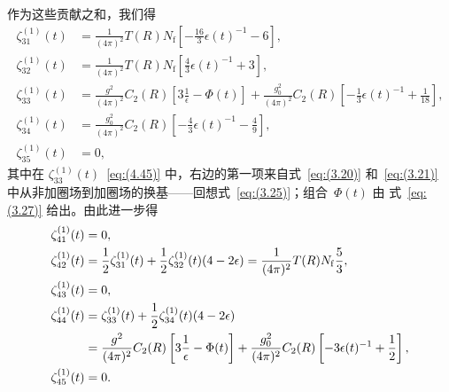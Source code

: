 %
作为这些贡献之和，我们得
\begin{align}
   \zeta_{31}^{(1)}(t)
   &=\frac{1}{(4\pi)^2}T(R)N_{\mathrm{f}}
   \left[-\frac{16}{3}\epsilon(t)^{-1}-6\right],
\label{eq:(4.43)}\\
   \zeta_{32}^{(1)}(t)
   &=\frac{1}{(4\pi)^2}T(R)N_{\mathrm{f}}
   \left[\frac{4}{3}\epsilon(t)^{-1}+3\right],
\label{eq:(4.44)}\\
   \zeta_{33}^{(1)}(t)
   &=\frac{g^2}{(4\pi)^2}C_2(R)
   \left[3\frac{1}{\epsilon}-\Phi(t)\right]
   +\frac{g_0^2}{(4\pi)^2}C_2(R)
   \left[-\frac{1}{3}\epsilon(t)^{-1}+\frac{1}{18}\right],
\label{eq:(4.45)}\\
   \zeta_{34}^{(1)}(t)
   &=\frac{g_0^2}{(4\pi)^2}C_2(R)
   \left[-\frac{4}{3}\epsilon(t)^{-1}-\frac{4}{9}\right],
\label{eq:(4.46)}\\
   \zeta_{35}^{(1)}(t)
   &=0,
\label{eq:(4.47)}
\end{align}
其中在 $\zeta_{33}^{(1)}(t)$~\eqref{eq:(4.45)}
中，右边的第一项来自式~\eqref{eq:(3.20)} 和~\eqref{eq:(3.21)}
中从非加圈场到加圈场的换基——回想式~\eqref{eq:(3.25)}；组合~$\Phi(t)$ 由
式~\eqref{eq:(3.27)} 给出。由此进一步得
\begin{align}
   \zeta_{41}^{(1)}(t)
   &=0,
\label{eq:(4.48)}\\
   \zeta_{42}^{(1)}(t)
   &=\frac{1}{2}\zeta_{31}^{(1)}(t)+\frac{1}{2}\zeta_{32}^{(1)}(t)(4-2\epsilon)
   =\frac{1}{(4\pi)^2}T(R)N_{\mathrm{f}}
   \frac{5}{3},
\label{eq:(4.49)}\\
   \zeta_{43}^{(1)}(t)
   &=0,
\label{eq:(4.50)}\\
   \zeta_{44}^{(1)}(t)
   &=\zeta_{33}^{(1)}(t)+\frac{1}{2}\zeta_{34}^{(1)}(t)(4-2\epsilon)
\notag\\
   &=\frac{g^2}{(4\pi)^2}C_2(R)
   \left[3\frac{1}{\epsilon}-\Phi(t)\right]
   +\frac{g_0^2}{(4\pi)^2}C_2(R)
   \left[-3\epsilon(t)^{-1}+\frac{1}{2}\right],
\label{eq:(4.51)}\\
   \zeta_{45}^{(1)}(t)
   &=0.
\label{eq:(4.52)}
\end{align}

